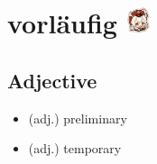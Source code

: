\section*{{\German vorläufig} \href{https://upload.wikimedia.org/wikipedia/commons/c/c7/De-vorläufig.ogg}{\includegraphics[width=0.05\textwidth]{audio}}}

\subsection*{Adjective}

\begin{itemize}
    \item (adj.) preliminary
    \item (adj.) temporary
\end{itemize}
